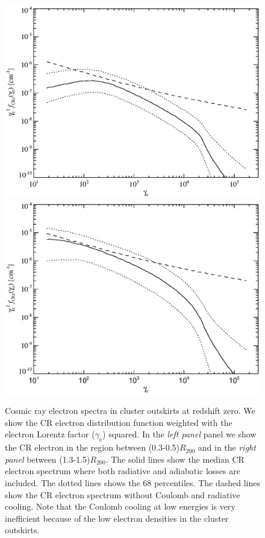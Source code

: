 \documentclass[useAMS,usenatbib]{mn2e}
\newcommand{\e}{\mathrm{e}}
\newcommand{\rvir}{R_{200}}
\begin{document}
\begin{figure}
\begin{minipage}{2.0\columnwidth}
  \includegraphics[width=0.49\columnwidth]{./figures/CRespec0.3Rv.140.v12.eps}
  \includegraphics[width=0.49\columnwidth]{./figures/CRespec1.4Rv.140.v12.eps}
  \caption{Cosmic ray electron spectra in cluster outskirts at
    redshift zero. We show the CR electron distribution function
    weighted with the electron Lorentz factor ($\gamma_\e$)
    squared. In the {\it left panel} panel we show the CR electron in
    the region between (0.3-0.5)$\rvir$ and in the {\it right panel}
    between (1.3-1.5)$\rvir$. The solid lines show the median CR
    electron spectrum where both radiative and adiabatic losses are
    included. The dotted lines shows the 68 percentiles. The dashed
    lines show the CR electron spectrum without Coulomb and radiative
    cooling. Note that the Coulomb cooling at low energies is very
    inefficient because of the low electron densities in the cluster
    outskirts. \label{fig:e_spec}}
\end{minipage}
\end{figure}
\end{document}
